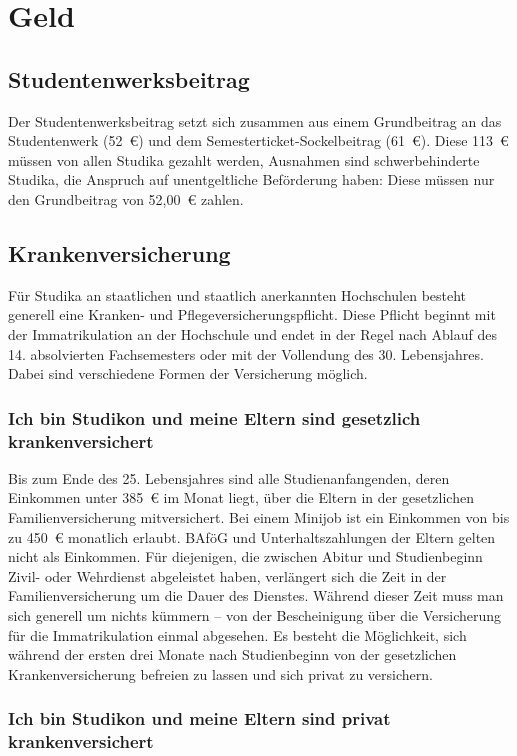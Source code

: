 \chapter{Geld}

\section{Studentenwerksbeitrag}
Der Studentenwerksbeitrag setzt sich zusammen aus einem Grundbeitrag an das Studentenwerk (52~€) und dem
Semesterticket-Sockelbeitrag (61~€).
Diese 113~€ müssen von allen Studika gezahlt werden, Ausnahmen sind schwerbehinderte Studika, die Anspruch
auf unentgeltliche Beförderung haben: Diese müssen nur den Grundbeitrag von 52,00~€ zahlen.

\section{Krankenversicherung}

Für Studika an staatlichen und staatlich anerkannten Hochschulen
besteht generell eine Kranken- und Pflegeversicherungspflicht. Diese
Pflicht beginnt mit der Immatrikulation an der Hochschule und endet in
der Regel nach Ablauf des 14. absolvierten Fachsemesters oder mit der
Vollendung des 30. Lebensjahres. Dabei sind verschiedene Formen der
Versicherung möglich.

\subsection*{Ich bin Studikon und meine Eltern sind gesetzlich krankenversichert}

Bis zum Ende des 25. Lebensjahres sind alle Studienanfangenden, 
deren Einkommen unter 385~€ im Monat liegt, über die Eltern in der
gesetzlichen Familienversicherung mitversichert.
Bei einem Minijob ist ein Einkommen von bis zu 450~€ monatlich erlaubt. BAföG und Unterhaltszahlungen
der Eltern gelten nicht als Einkommen. Für diejenigen, die
zwischen Abitur und Studienbeginn Zivil- oder Wehrdienst abgeleistet
haben, verlängert sich die Zeit in der Familienversicherung um die
Dauer des Dienstes. Während dieser Zeit muss man sich generell um
nichts kümmern – von der Bescheinigung über die Versicherung für die
Immatrikulation einmal abgesehen. Es besteht die Möglichkeit, sich
während der ersten drei Monate nach Studienbeginn von der
gesetzlichen Krankenversicherung befreien zu lassen und sich privat zu
versichern.

\subsection*{Ich bin Studikon und meine Eltern sind privat krankenversichert}

